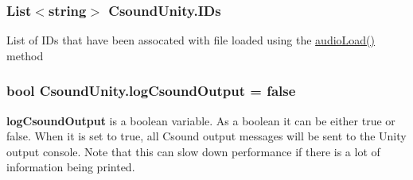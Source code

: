 \subsubsection[{I\+Ds}]{\setlength{\rightskip}{0pt plus 5cm}List$<$string$>$ Csound\+Unity.\+I\+Ds\hspace{0.3cm}{\ttfamily [private]}}\label{class_csound_unity_a7b8bf3df0f6b36a6509c45d71b1f202d}
List of I\+Ds that have been assocated with file loaded using the \hyperlink{class_csound_unity_a5c571bca9cfc3628f977a16c2d56a48f}{audio\+Load()} method \hypertarget{class_csound_unity_a82c718d7b9393a4afb5d231e0bbef663}{}
\subsubsection[{log\+Csound\+Output}]{\setlength{\rightskip}{0pt plus 5cm}bool Csound\+Unity.\+log\+Csound\+Output = false}\label{class_csound_unity_a82c718d7b9393a4afb5d231e0bbef663}
{\bfseries log\+Csound\+Output} is a boolean variable. As a boolean it can be either true or false. When it is set to true, all Csound output messages will be sent to the Unity output console. Note that this can slow down performance if there is a lot of information being printed. 